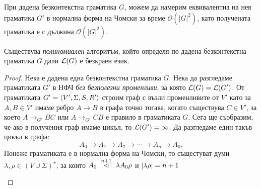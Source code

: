 \begin{theorem}
  При дадена безконтекстна граматика $G$, можем да намерим еквивалентна
  на нея граматика $G'$ в нормална форма на Чомски за време $\mathcal{O}(|G|^2)$,
  като получената граматика е с дължина $\mathcal{O}(|G|^2)$.
\end{theorem}

\begin{theorem}
  Съществува \emph{полиномиален} алгоритъм, който определя по дадена безконтекстна граматика $G$ дали $\mathcal{L}(G)$ е безкраен език.
\end{theorem}
\begin{proof}
  Нека е дадена една безконтекстна граматика $G$.
  Нека да разгледаме граматиката $G'$ в НФЧ {\em без безполезни променливи}, за която $\mathcal{L}(G) = \mathcal{L}(G')$.
  От граматиката $G' = \langle{V',\Sigma,S,R'}\rangle$ строим граф с възли променливите от $V'$ като
  за $A,B \in V'$ имаме ребро $A \to B$ в графа точно тогава, когато съществува $C \in V'$,
  за което $A \to_{G'} BC$ или $A \to_{G'} CB$ е правило в граматиката $G$.
  Сега ще съобразим, че ако в получения граф имаме цикъл, то $\mathcal{L}(G') = \infty$.
  Да разгледаме един такъв цикъл в графа:
  \[A_0 \to A_1 \to A_2 \to \cdots \to A_n \to A_0.\]
  Понеже граматиката е в нормална форма на Чомски, то същестуват думи $\lambda,\rho \in (V\cup\Sigma)^\star$, за които $A_0 ~\stackrel{{n+1}}{\lhd}~ \lambda A_0 \rho$ и $\vert{\lambda\rho}\vert = n+1$

  \begin{figure}[H]
    \begin{subfigure}[t]{0.5\textwidth}
    \centering
\end{subfigure}
\end{figure}
\end{proof}
